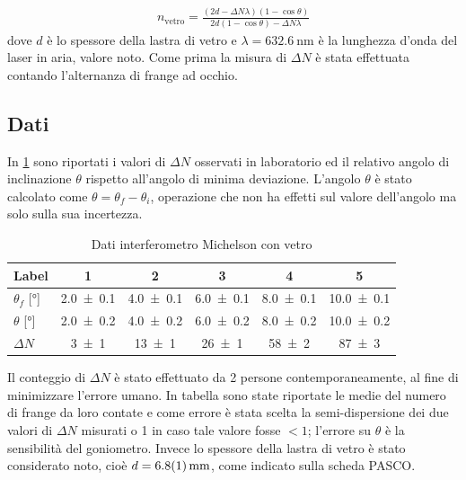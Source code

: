 \documentclass[a4paper]{article}
\begin{document}
\begin{align}
    n_{\text{vetro}} = \frac{(2d - \Delta N \lambda)(1 - \cos\theta)}{2d(1 - \cos\theta) - \Delta N \lambda}
\label{eq:indice-rifrazione-vetro}
\end{align}
dove $d$ è lo spessore della lastra di vetro e $\lambda=\SI{632.6}{\nano\meter}$ è la lunghezza d'onda del laser in aria, valore noto.
Come prima la misura di $\Delta N$ è stata effettuata contando l'alternanza di frange ad occhio.
\subsection{Dati}
In \cref{tab:valori-michelson-vetro} sono riportati i valori di $\Delta N$ osservati in laboratorio ed il relativo angolo di inclinazione $\theta$ rispetto all'angolo di minima deviazione. L'angolo $\theta$ è stato calcolato come $\theta = \theta_f - \theta_i$, operazione che non ha effetti sul valore dell'angolo ma solo sulla sua incertezza.

\begin{table}[htbp]
\centering
\caption{Dati interferometro Michelson con vetro}
\label{tab:valori-michelson-vetro}
\begin{tabular}{|l|ccccc|}
\hline
Label & 1 & 2 & 3 & 4 & 5 \\\hline\hline
$\theta_f$ [\si{\degree}] & \num{2.0 \pm 0.1} & \num{4.0 \pm 0.1} & \num{6.0 \pm 0.1} & \num{8.0 \pm 0.1} & \num{10.0 \pm 0.1} \\\hline
$\theta$ [\si{\degree}] & \num{2.0 \pm 0.2} & \num{4.0 \pm 0.2} & \num{6.0 \pm 0.2} & \num{8.0 \pm 0.2} & \num{10.0 \pm 0.2} \\\hline
$\Delta N$ & \num{3 \pm 1} & \num{13 \pm 1} & \num{26 \pm 1} & \num{58 \pm 2} & \num{87 \pm 3} \\\hline
\end{tabular}
\end{table}

Il conteggio di $\Delta N$ è stato effettuato da 2 persone contemporaneamente, al fine di minimizzare l'errore umano. In tabella sono state riportate le medie del numero di frange da loro contate e come errore è stata scelta la semi-dispersione dei due valori di $\Delta N$ misurati o 1 in caso tale valore fosse $<1$; l'errore su $\theta$ è la sensibilità del goniometro. Invece lo spessore della lastra di vetro è stato considerato noto, cioè $d=\SI{6.8 \pm 0.1}{\milli\meter}$, come indicato sulla scheda PASCO.
\end{document}
